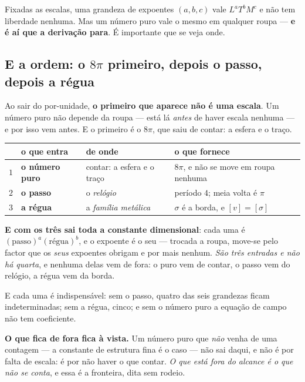 \documentclass[11pt,a4paper]{article}
\begin{document}
\noindent Fixadas as escalas, uma grandeza de expoentes $(a,b,c)$ vale $L^aT^bM^c$ e não tem
liberdade nenhuma. Mas um número puro vale o mesmo em qualquer roupa --- \textbf{e é aí que a
derivação para}. É importante que se veja onde.

\subsection*{E a ordem: o $8\pi$ primeiro, depois o passo, depois a régua}

Ao sair do por-unidade, \textbf{o primeiro que aparece não é uma escala}. Um número puro não depende
da roupa --- está lá \emph{antes} de haver escala nenhuma --- e por isso vem antes. E o primeiro é o
$8\pi$, que saiu de contar: a esfera e o traço.

\begin{center}\small
\begin{tabular}{@{}rlll@{}}
\toprule
 & o que entra & de onde & o que fornece \\
\midrule
$1$ & \textbf{o número puro} & contar: a esfera e o traço & $8\pi$, e não se move em roupa nenhuma \\
$2$ & \textbf{o passo} & o \emph{relógio} & período $4$; meia volta é $\pi$ \\
$3$ & \textbf{a régua} & a \emph{família metálica} & $\sigma$ é a borda, e $[v]=[\sigma]$ \\
\bottomrule
\end{tabular}
\end{center}

\noindent \textbf{E com os três sai toda a constante dimensional}: cada uma é
$(\text{passo})^a(\text{régua})^b$, e o expoente é o seu --- trocada a roupa, move-se pelo factor que
os \emph{seus} expoentes obrigam e por mais nenhum. \emph{São três entradas e não há quarta}, e
nenhuma delas vem de fora: o puro vem de contar, o passo vem do relógio, a régua vem da borda.

\smallskip
\noindent E cada uma é indispensável: sem o passo, quatro das seis grandezas ficam indeterminadas;
sem a régua, cinco; e sem o número puro a equação de campo não tem coeficiente.

\smallskip
\noindent \textbf{O que fica de fora fica à vista.} Um número puro que \emph{não} venha de uma
contagem --- a constante de estrutura fina é o caso --- não sai daqui, e não é por falta de escala:
é por não haver o que contar. \emph{O que está fora do alcance é o que não se conta}, e essa é a
fronteira, dita sem rodeio.
\end{document}
